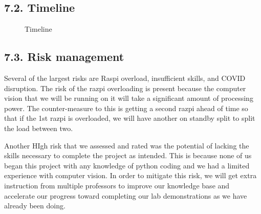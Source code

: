 \documentclass[10pt]{article}
\begin{document}
\subsection{7.2. Timeline}
%
%
%
%
%
%
%
%
%
\begin{figure}
\caption{Timeline}
\label{fig:timeline}
\end{figure}

\subsection{7.3. Risk management}
Several of the largest risks are Raspi overload, insufficient skills, and COVID disruption.  The risk of the razpi overloading is present because the computer vision that we will be running on it will take a significant amount of processing power.  The counter-measure to this is getting a second razpi ahead of time so that if the 1st razpi is overloaded, we will have another on standby split to split the load between two.  

Another HIgh risk that we assessed and rated was the potential of lacking the skills necessary to complete the project as intended.  This is because none of us began this project with any knowledge of python coding and we had a limited experience with computer vision.  In order to mitigate this risk, we will get extra instruction from multiple professors to improve our knowledge base and accelerate our progress toward completing our lab demonstrations as we have already been doing. 
 
\end{document}

